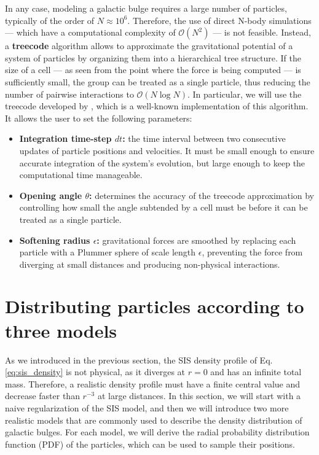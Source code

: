 \documentclass[fleqn,usenatbib]{mnras}
\begin{document}
In any case, modeling a galactic bulge requires a large number of particles, typically of the order of $N \approx 10^6$.
Therefore, the use of direct N-body simulations — which have a computational complexity of $\mathcal{O}(N^2)$ — is not feasible.
Instead, a \textbf{treecode} algorithm allows to approximate the gravitational potential of a system of particles by organizing them into a hierarchical tree structure.
If the size of a cell — as seen from the point where the force is being computed — is sufficiently small, the group can be treated as a single particle, thus reducing the number of pairwise interactions to $\mathcal{O}(N \log N)$.
In particular, we will use the treecode developed by \cite{Barnes1986}, which is a well-known implementation of this algorithm.
It allows the user to set the following parameters:
\begin{itemize}[wide, labelwidth=!, itemindent=!, labelindent=0pt, itemsep=0.1em]
  \item \textbf{Integration time-step $dt$:} the time interval between two consecutive updates of particle positions and velocities. It must be small enough to ensure accurate integration of the system's evolution, but large enough to keep the computational time manageable. 
  \item \textbf{Opening angle $\theta$:} determines the accuracy of the treecode approximation by controlling how small the angle subtended by a cell must be before it can be treated as a single particle.
  \item \textbf{Softening radius $\epsilon$:} gravitational forces are smoothed by replacing each particle with a Plummer sphere of scale length $\epsilon$, preventing the force from diverging at small distances and producing non-physical interactions. 
\end{itemize}


\section{Distributing particles according to three models}\label{sec:observation}
As we introduced in the previous section, the SIS density profile of Eq. \ref{eq:sis_density} is not physical, as it diverges at $r=0$ and has an infinite total mass.
Therefore, a realistic density profile must have a finite central value and decrease faster than $r^{-3}$ at large distances.
In this section, we will start with a naive regularization of the SIS model, and then we will introduce two more realistic models that are commonly used to describe the density distribution of galactic bulges.
For each model, we will derive the radial probability distribution function (PDF) of the particles, which can be used to sample their positions.
\vspace{0.5em}
\end{document}
